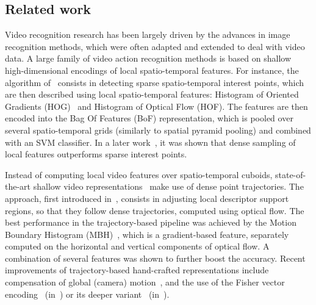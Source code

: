 \documentclass{article} \usepackage{nips14submit_e,times}
\begin{document}
\subsection{Related work}
\label{sec:related_work}
Video recognition research has been largely driven by the advances in image recognition methods, which were often adapted and extended to deal with video data.
A large family of video action recognition methods is based on shallow high-dimensional encodings of local spatio-temporal features. 
For instance, the algorithm of~\cite{Laptev08} consists in detecting sparse spatio-temporal interest points,
which are then described using local spatio-temporal features: Histogram of Oriented Gradients (HOG)~\cite{Dalal05} and Histogram of Optical Flow (HOF). The features
are then encoded into the Bag Of Features (BoF) representation, which is pooled over several spatio-temporal grids (similarly to spatial pyramid pooling)
and combined with an SVM classifier. In a later work~\cite{Wang09}, it was shown that dense sampling of local features outperforms sparse interest points.

Instead of computing local video features over spatio-temporal cuboids, state-of-the-art shallow video representations~\cite{Wang13b,Peng14,Peng14a} make use of dense point trajectories.
The approach, first introduced in~\cite{Wang11b}, consists in adjusting local descriptor support regions, so that they follow dense trajectories, computed using optical flow.
The best performance in the trajectory-based pipeline was achieved by the Motion Boundary Histogram (MBH)~\cite{Dalal06}, which is a
gradient-based feature, separately computed on the horizontal and vertical components of optical flow. A combination of several features was shown to further boost the accuracy.
Recent improvements of trajectory-based hand-crafted representations include compensation of global (camera) motion~\cite{Jain13,Kuehne11,Wang13b}, and the use of the Fisher vector 
encoding~\cite{Perronnin10a} (in~\cite{Wang13b}) or its deeper variant~\cite{Simonyan13b} (in~\cite{Peng14a}).
\end{document}
